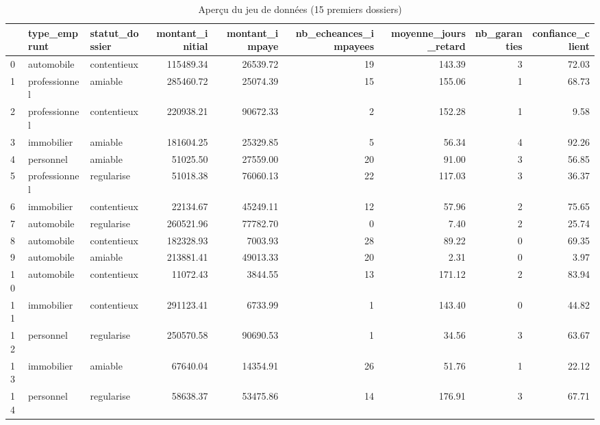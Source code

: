 \begin{table}
\caption{Aperçu du jeu de données (15 premiers dossiers)}
\label{tab:apercu_dataset}
\begin{tabular}{lllrrrrrr}
\toprule
 & type_emprunt & statut_dossier & montant_initial & montant_impaye & nb_echeances_impayees & moyenne_jours_retard & nb_garanties & confiance_client \\
\midrule
0 & automobile & contentieux & 115489.34 & 26539.72 & 19 & 143.39 & 3 & 72.03 \\
1 & professionnel & amiable & 285460.72 & 25074.39 & 15 & 155.06 & 1 & 68.73 \\
2 & professionnel & contentieux & 220938.21 & 90672.33 & 2 & 152.28 & 1 & 9.58 \\
3 & immobilier & amiable & 181604.25 & 25329.85 & 5 & 56.34 & 4 & 92.26 \\
4 & personnel & amiable & 51025.50 & 27559.00 & 20 & 91.00 & 3 & 56.85 \\
5 & professionnel & regularise & 51018.38 & 76060.13 & 22 & 117.03 & 3 & 36.37 \\
6 & immobilier & contentieux & 22134.67 & 45249.11 & 12 & 57.96 & 2 & 75.65 \\
7 & automobile & regularise & 260521.96 & 77782.70 & 0 & 7.40 & 2 & 25.74 \\
8 & automobile & contentieux & 182328.93 & 7003.93 & 28 & 89.22 & 0 & 69.35 \\
9 & automobile & amiable & 213881.41 & 49013.33 & 20 & 2.31 & 0 & 3.97 \\
10 & automobile & contentieux & 11072.43 & 3844.55 & 13 & 171.12 & 2 & 83.94 \\
11 & immobilier & contentieux & 291123.41 & 6733.99 & 1 & 143.40 & 0 & 44.82 \\
12 & personnel & regularise & 250570.58 & 90690.53 & 1 & 34.56 & 3 & 63.67 \\
13 & immobilier & amiable & 67640.04 & 14354.91 & 26 & 51.76 & 1 & 22.12 \\
14 & personnel & regularise & 58638.37 & 53475.86 & 14 & 176.91 & 3 & 67.71 \\
\bottomrule
\end{tabular}
\end{table}
